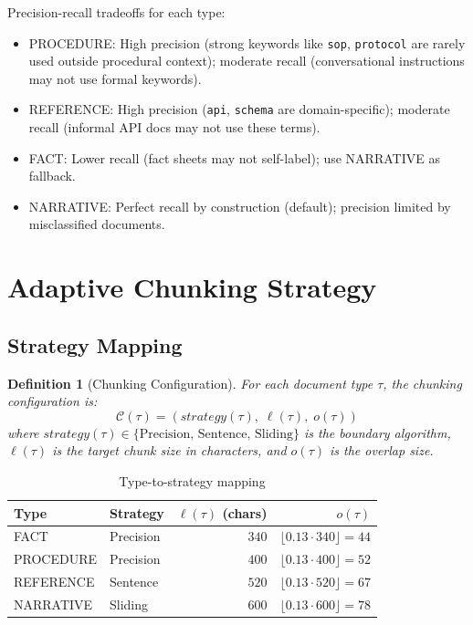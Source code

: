 \documentclass[conference]{IEEEtran}
\newtheorem{definition}{Definition}
\begin{document}
Precision-recall tradeoffs for each type:
\begin{itemize}
  \item PROCEDURE: High precision (strong keywords like
    \texttt{sop}, \texttt{protocol} are rarely used outside
    procedural context); moderate recall (conversational
    instructions may not use formal keywords).
  \item REFERENCE: High precision (\texttt{api},
    \texttt{schema} are domain-specific); moderate recall
    (informal API docs may not use these terms).
  \item FACT: Lower recall (fact sheets may not self-label);
    use NARRATIVE as fallback.
  \item NARRATIVE: Perfect recall by construction (default);
    precision limited by misclassified documents.
\end{itemize}

\section{Adaptive Chunking Strategy}
\label{sec:chunking}

\subsection{Strategy Mapping}

\begin{definition}[Chunking Configuration]
\label{def:chunk_config}
For each document type $\tau$, the chunking configuration is:
\begin{equation}
  \mathcal{C}(\tau) = (\textit{strategy}(\tau),\;
                        \ell(\tau),\;
                        o(\tau))
  \label{eq:chunk_config}
\end{equation}
where $\textit{strategy}(\tau) \in \{\text{Precision,
Sentence, Sliding}\}$ is the boundary algorithm, $\ell(\tau)$
is the target chunk size in characters, and $o(\tau)$ is
the overlap size.
\end{definition}

\begin{table}[t]
\centering
\caption{Type-to-strategy mapping}
\label{tab:mapping}
\begin{tabular}{llrr}
\toprule
Type & Strategy & $\ell(\tau)$ (chars) & $o(\tau)$ \\
\midrule
FACT      & Precision & $340$ & $\lfloor 0.13 \cdot 340 \rfloor = 44$ \\
PROCEDURE & Precision & $400$ & $\lfloor 0.13 \cdot 400 \rfloor = 52$ \\
REFERENCE & Sentence  & $520$ & $\lfloor 0.13 \cdot 520 \rfloor = 67$ \\
NARRATIVE & Sliding   & $600$ & $\lfloor 0.13 \cdot 600 \rfloor = 78$ \\
\bottomrule
\end{tabular}
\end{table}
\end{document}
